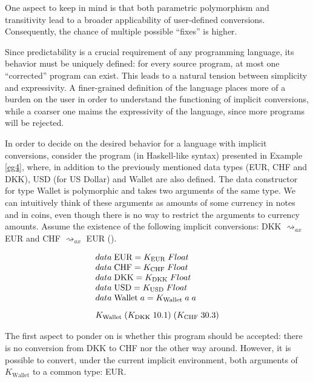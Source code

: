 One aspect to keep in mind is that both parametric polymorphism and transitivity lead to a broader applicability of user-defined conversions. Consequently, the chance of multiple possible ``fixes'' is higher.

Since predictability is a crucial requirement of any programming language, its behavior must be uniquely defined: for every source program, at most one ``corrected'' program can exist. This leads to a natural tension between simplicity and expressivity. A finer-grained definition of the language places more of a burden on the user in order to understand the functioning of implicit conversions, while a coarser one maims the expressivity of the language, since more programs will be rejected.

In order to decide on the desired behavior for a language with implicit conversions, consider the program (in Haskell-like syntax) presented in Example \ref{eg4}, where, in addition to the previously mentioned data types (EUR, CHF and DKK), USD (for US Dollar) and Wallet are also defined. The data constructor for type Wallet is polymorphic and takes two arguments of the same type. We can intuitively think of these arguments as amounts of some currency in notes and in coins, even though there is no way to restrict the arguments to currency amounts. Assume the existence of the following implicit conversions: DKK $\rightsquigarrow_{ax}$ EUR and CHF $\rightsquigarrow_{ax}$ EUR ().
 \begin{eg}
\[
\begin{array}{@{\hspace{0mm}}l@{\hspace{0mm}}}
data\;\text{EUR}=K_{\text{EUR}}\;Float\\
data\;\text{CHF}=K_{\text{CHF}}\;Float\\
data\;\text{DKK}=K_{\text{DKK}}\;Float\\
data\;\text{USD}=K_{\text{USD}}\;Float\\
data\;\text{Wallet}\;a = K_{\text{Wallet}} \;a \;a\\[3mm]
K_{\text{Wallet}}\;(K_{\text{DKK}}\;10.1)\;(K_{\text{CHF}}\;30.3)
\end{array}
\]

\caption{}
\label{eg4}
\end{eg}
The first aspect to ponder on is whether this program should be accepted: there is no conversion from DKK to CHF nor the other way around. However, it is possible to convert, under the current implicit environment, both arguments of $K_{\text{Wallet}}$ to a common type: EUR. 

